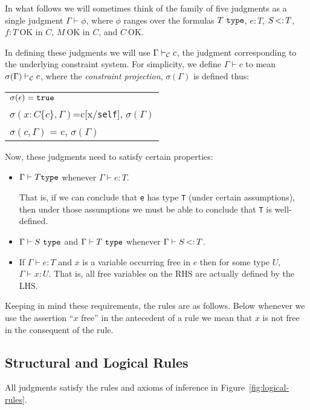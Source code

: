 \documentclass[preprint,nocopyrightspace,9pt]{sigplanconf}
\def\self{\mbox{\tt self}}
\def\type{\mbox{\tt type}}
\begin{document}
In what follows we will sometimes think of the family of five
judgments as a single judgment $\Gamma \vdash \phi$, where $\phi$
ranges over the formulas $T\ \tt type$, $e:T$, $S \subtype T$, $f:T\
\mbox{OK in $C$}$, $M\ \mbox{OK in $C$}$, and $C\ \mbox{OK}$.

In defining these judgments we will use $\Gamma \vdash_{\cal C} c$,
the judgment corresponding to the underlying constraint system. For simplicity,
we define $\Gamma \vdash c$ to mean $\sigma(\Gamma)\vdash_{\cal C} c$,
where the {\em constraint projection}, $\sigma(\Gamma)$ is defined thus:

\begin{tabular}{l}
$\sigma(\epsilon)={\tt true}$\\
$\sigma(x:C\{c\}, \Gamma)$=c[x/\self], $\sigma(\Gamma)$\\
$\sigma(c,\Gamma)$ = c, $\sigma(\Gamma)$
\end{tabular}

Now, these judgments need to satisfy certain properties:
\begin{itemize}
  \item $\Gamma \vdash T {\tt type}$ whenever $\Gamma \vdash e:T$. 

That is, if we can conclude that {\tt e} has type {\tt T} (under
certain assumptions), then under those assumptions we must be able to
conclude that {\tt T} is well-defined.

\item $\Gamma \vdash S\ \type$ and $\Gamma \vdash T\ \type$ whenever $\Gamma \vdash
S \subtype T$.
\item If $\Gamma \vdash e:T$ and $x$ is a variable occurring free in
$e$ then for some type $U$, $\Gamma \vdash x:U$. That is, all free
variables on the RHS are actually defined by the LHS.
\end{itemize}

Keeping in mind these requirements, the rules are as follows. Below
whenever we use the assertion 
``$x$ free'' in the antecedent of a rule we
mean that $x$ is not free in the consequent of the rule.

\subsection{Structural and Logical Rules} 

All judgments satisfy the rules and axioms of inference in
Figure~\ref{fig:logical-rules}.
\end{document}
